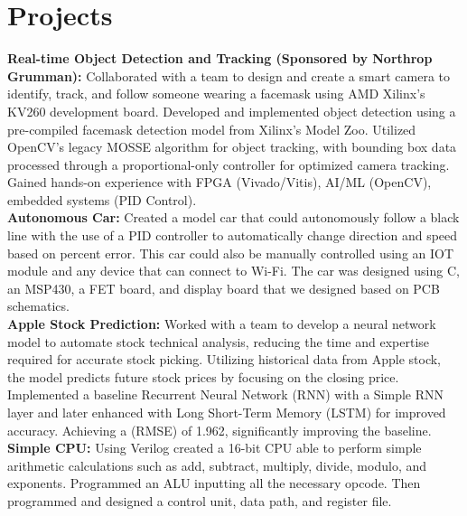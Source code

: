 \documentclass[letterpaper,10pt]{article}
\begin{document}
\section*{Projects}
\textbf{Real-time Object Detection and Tracking (Sponsored by Northrop Grumman): } Collaborated with a team to design and create a smart camera to identify, track, and follow someone wearing a facemask using AMD Xilinx’s KV260 development board. Developed and implemented object detection using a pre-compiled facemask detection model from Xilinx’s Model Zoo. Utilized OpenCV’s legacy MOSSE algorithm for object tracking, with bounding box data processed through a proportional-only controller for optimized camera tracking. Gained hands-on experience with FPGA (Vivado/Vitis), AI/ML (OpenCV), embedded systems (PID Control).\\
\textbf{Autonomous Car:} Created a model car that could autonomously follow a black line with the use of a PID controller to automatically change direction and speed based on percent error. This car could also be manually controlled using an IOT module and any device that can connect to Wi-Fi. The car was designed using C, an MSP430, a FET board, and display board that we designed based on PCB schematics. \\
\textbf{Apple Stock Prediction:} Worked with a team to develop a neural network model to automate stock technical analysis, reducing the time and expertise required for accurate stock picking. Utilizing historical data from Apple stock, the model predicts future stock prices by focusing on the closing price. Implemented a baseline Recurrent Neural Network (RNN) with a Simple RNN layer and later enhanced with Long Short-Term Memory (LSTM) for improved accuracy. Achieving a (RMSE) of 1.962, significantly improving the baseline.\\
\textbf{Simple CPU:} Using Verilog created a 16-bit CPU able to perform simple arithmetic calculations such as add, subtract, multiply, divide, modulo, and exponents. Programmed an ALU inputting all the necessary opcode. Then programmed and designed a control unit, data path, and register file. \\
\end{document}
